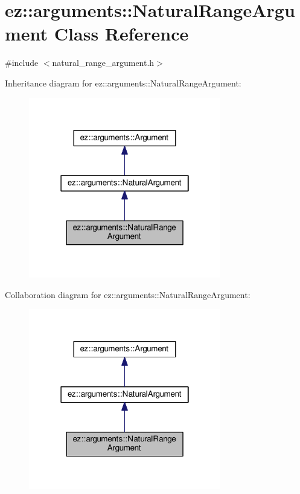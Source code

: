 \hypertarget{classez_1_1arguments_1_1NaturalRangeArgument}{}\section{ez\+:\+:arguments\+:\+:Natural\+Range\+Argument Class Reference}
\label{classez_1_1arguments_1_1NaturalRangeArgument}


{\ttfamily \#include $<$natural\+\_\+range\+\_\+argument.\+h$>$}



Inheritance diagram for ez\+:\+:arguments\+:\+:Natural\+Range\+Argument\+:
\nopagebreak
\begin{figure}[H]
\begin{center}
\leavevmode
\includegraphics[width=238pt]{classez_1_1arguments_1_1NaturalRangeArgument__inherit__graph}
\end{center}
\end{figure}


Collaboration diagram for ez\+:\+:arguments\+:\+:Natural\+Range\+Argument\+:
\nopagebreak
\begin{figure}[H]
\begin{center}
\leavevmode
\includegraphics[width=238pt]{classez_1_1arguments_1_1NaturalRangeArgument__coll__graph}
\end{center}
\end{figure}

